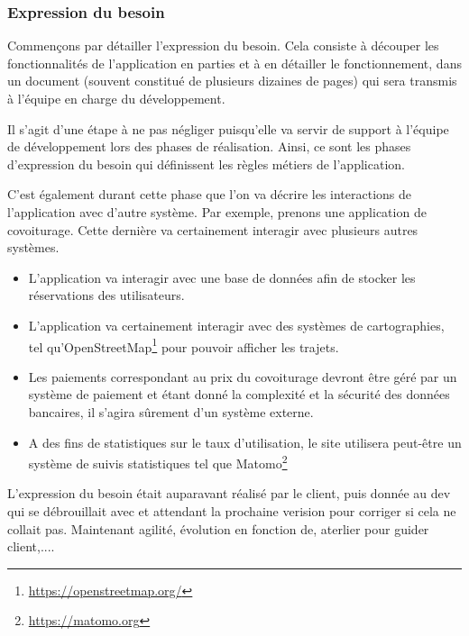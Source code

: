 \subsubsection{Expression du besoin}

Commençons par détailler l'expression du besoin. Cela consiste à découper les fonctionnalités de l'application en parties et à en détailler le fonctionnement, dans un document (souvent constitué de plusieurs dizaines de pages) qui sera transmis à l'équipe en charge du développement.

Il s'agit d'une étape à ne pas négliger puisqu'elle va servir de support à l'équipe de développement lors des phases de réalisation. Ainsi, ce sont les phases d'expression du besoin qui définissent les règles métiers de l'application. 

C'est également durant cette phase que l'on va décrire les interactions de l'application avec d'autre système. Par exemple, prenons une application de covoiturage. Cette dernière va certainement interagir avec plusieurs autres systèmes.

\begin{itemize}
	\setlength\itemsep{0em}
	\item L'application va interagir avec une base de données afin de stocker les réservations des utilisateurs.
	\item L'application va certainement interagir avec des systèmes de cartographies, tel qu'OpenStreetMap\footnote{\url{https://openstreetmap.org/}} pour pouvoir afficher les trajets.
	\item Les paiements correspondant au prix du covoiturage devront être géré par un système de paiement et étant donné la complexité et la sécurité des données bancaires, il s'agira sûrement d'un système externe.
	\item A des fins de statistiques sur le taux d'utilisation, le site utilisera peut-être un système de suivis statistiques tel que Matomo\footnote{\url{https://matomo.org}} 
\end{itemize}


L'expression du besoin était auparavant réalisé par le client, puis donnée au dev qui se débrouillait avec et attendant la prochaine verision pour corriger si cela ne collait pas. Maintenant agilité, évolution en fonction de, aterlier pour guider client,....



